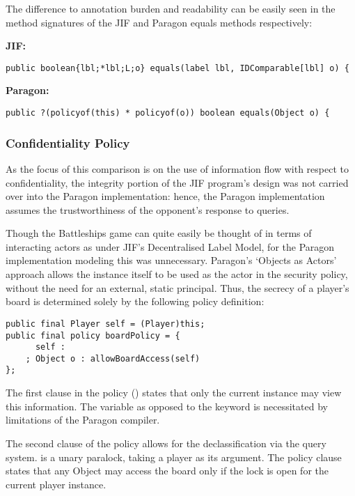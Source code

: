 The difference to annotation burden and readability can be easily seen in the method signatures of the JIF and Paragon equals methods respectively:

\textbf{JIF:}

\begin{verbatim}
public boolean{lbl;*lbl;L;o} equals(label lbl, IDComparable[lbl] o) {
\end{verbatim}

\textbf{Paragon:}

\begin{verbatim}
public ?(policyof(this) * policyof(o)) boolean equals(Object o) {
\end{verbatim}

\subsubsection{Confidentiality Policy}

As the focus of this comparison is on the use of information flow with respect to confidentiality, the integrity portion of the JIF program's design was not carried over into the Paragon implementation: hence, the Paragon implementation assumes the trustworthiness of the opponent's response to queries.

Though the Battleships game can quite easily be thought of in terms of interacting actors as under JIF's Decentralised Label Model, for the Paragon implementation modeling this was unnecessary. Paragon's `Objects as Actors' approach allows the  instance itself to be used as the actor in the security policy, without the need for an external, static principal. Thus, the secrecy of a player's board is determined solely by the following policy definition:

\begin{verbatim}
public final Player self = (Player)this;
public final policy boardPolicy = {
	  self :
	; Object o : allowBoardAccess(self)
};
\end{verbatim}

The first clause in the policy () states that only the current instance may view this information. The  variable as opposed to the  keyword is necessitated by limitations of the Paragon compiler.

The second clause of the policy allows for the declassification via the query system.  is a unary paralock, taking a player as its argument. The policy clause states that any Object  may access the board only if the  lock is open for the current player instance.

